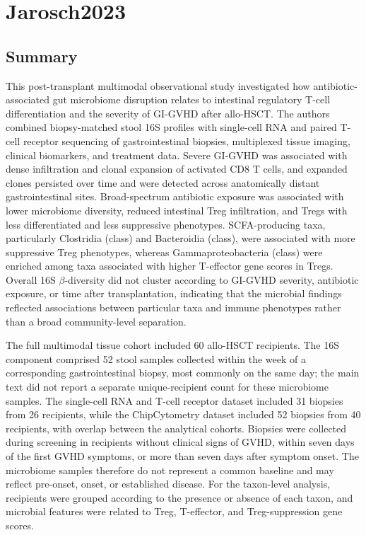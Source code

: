 \documentclass[11pt,a4paper]{article}
\begin{document}
\section{Jarosch2023}
\subsection{Summary}

This post-transplant multimodal observational study investigated how antibiotic-associated gut microbiome disruption relates to intestinal regulatory T-cell differentiation and the severity of GI-GVHD after allo-HSCT. The authors combined biopsy-matched stool 16S profiles with single-cell RNA and paired T-cell receptor sequencing of gastrointestinal biopsies, multiplexed tissue imaging, clinical biomarkers, and treatment data. Severe GI-GVHD was associated with dense infiltration and clonal expansion of activated CD8 T cells, and expanded clones persisted over time and were detected across anatomically distant gastrointestinal sites. Broad-spectrum antibiotic exposure was associated with lower microbiome diversity, reduced intestinal Treg infiltration, and Tregs with less differentiated and less suppressive phenotypes. SCFA-producing taxa, particularly Clostridia (class) and Bacteroidia (class), were associated with more suppressive Treg phenotypes, whereas Gammaproteobacteria (class) were enriched among taxa associated with higher T-effector gene scores in Tregs. Overall 16S $\beta$-diversity did not cluster according to GI-GVHD severity, antibiotic exposure, or time after transplantation, indicating that the microbial findings reflected associations between particular taxa and immune phenotypes rather than a broad community-level separation. 
\par

The full multimodal tissue cohort included 60 allo-HSCT recipients. The 16S component comprised 52 stool samples collected within the week of a corresponding gastrointestinal biopsy, most commonly on the same day; the main text did not report a separate unique-recipient count for these microbiome samples. The single-cell RNA and T-cell receptor dataset included 31 biopsies from 26 recipients, while the ChipCytometry dataset included 52 biopsies from 40 recipients, with overlap between the analytical cohorts. Biopsies were collected during screening in recipients without clinical signs of GVHD, within seven days of the first GVHD symptoms, or more than seven days after symptom onset. The microbiome samples therefore do not represent a common baseline and may reflect pre-onset, onset, or established disease. For the taxon-level analysis, recipients were grouped according to the presence or absence of each taxon, and microbial features were related to Treg, T-effector, and Treg-suppression gene scores.
\par
\end{document}
